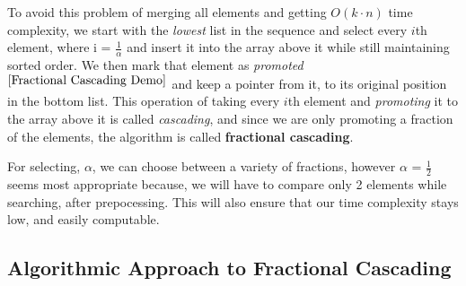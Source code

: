 \documentclass[11pt]{article}
\begin{document}
To avoid this problem of merging all elements and getting $O(k \cdot n)$ time complexity, we start with the \textit{lowest} list in the sequence and select every $i$th element, where i = $\frac{1}{\alpha}$ and insert it into the array above it while still maintaining sorted order. We then mark that element as \textit{promoted}$^{\cite{Fractional Cascading Demo}}$ and keep a pointer from it, to its original position in the bottom list. This operation of taking every $i$th element and \textit{promoting} it to the array above it is called \textit{cascading}, and since we are only promoting a fraction of the elements, the algorithm is called \textbf{fractional cascading}.

For selecting, $\alpha$, we can choose between a variety of fractions, however $\alpha$ = $\frac{1}{2}$ seems most appropriate because, we will have to compare only 2 elements while searching, after prepocessing. This will also ensure that our time complexity stays low, and easily computable.


\subsection{Algorithmic Approach to Fractional Cascading}
\end{document}
